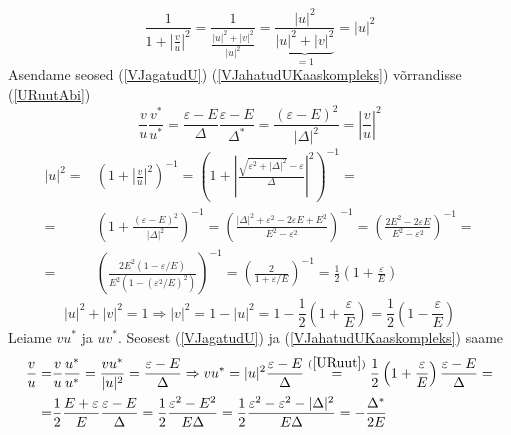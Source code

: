 \documentclass[class=article, crop=false]{standalone}
\begin{document}
\begin{equation}\label{URuutAbi}
	\frac{1}{1 + \left| \frac{v}{u} \right|^{2}} = \frac{1}{ \frac{|u|^{2} + |v|^{2}}{|u|^{2}}} = \frac{|u|^{2}}{\underbrace{|u|^{2} + |v|^{2}}_{=1}} = |u|^{2}
\end{equation}
Asendame seosed (\ref{VJagatudU}) (\ref{VJahatudUKaaskompleks}) võrrandisse (\ref{URuutAbi})
\begin{equation}\label{key}
	\frac{v}{u} \frac{v^{ \ast}}{u^{ \ast}} = \frac{ \varepsilon - E}{ \Delta} \frac{ \varepsilon - E}{ \Delta^{ \ast}} = \frac{( \varepsilon - E)^{2}}{| \Delta|^{2}} = \left| \frac{v}{u} \right|^{2}
\end{equation}
\begin{equation}\label{URuut}
	\begin{split}
		|u|^{2} = & \left( 1 + \left| \frac{v}{u} \right|^{2} \right)^{-1} = \left( 1 + \left| \frac{ \sqrt{ \varepsilon^{2} + | \Delta|^{2}} - \varepsilon}{ \Delta} \right|^{2} \right)^{-1} = \\
		= & \left( 1 + \frac{( \varepsilon - E)^{2}}{| \Delta|^{2}} \right)^{-1} = \left(\frac{| \Delta|^{2} + \varepsilon^{2} - 2 \varepsilon E + E^{2}}{ E^{2} - \varepsilon^{2}} \right)^{-1} = \left( \frac{2E^{2} - 2 \varepsilon E}{E^{2} - \varepsilon^{2}} \right)^{-1} = \\
		= & \left( \frac{2 E^{2} (1 - \varepsilon/E)}{E^{2} (1 - ( \varepsilon^{2}/E)^{2})} \right)^{-1} = \left( \frac{2}{1 + \varepsilon/E} \right)^{-1} = \frac{1}{2} \left( 1 + \frac{ \varepsilon}{E} \right) 
	\end{split}
\end{equation}
\begin{equation}\label{VRuut}
	|u|^{2} + |v|^{2} = 1 \Rightarrow |v|^{2} = 1 - |u|^{2} = 1 - \frac{1}{2} \left( 1 + \frac{ \varepsilon}{E} \right) = \frac{1}{2} \left( 1 - \frac{ \varepsilon}{E} \right)
\end{equation}
Leiame $ v u^{ \ast} $ ja $ u v^{ \ast} $. Seosest (\ref{VJagatudU}) ja (\ref{VJahatudUKaaskompleks}) saame
\begin{equation}\label{key}
	\begin{split}
		\frac{v}{u} = & \frac{v}{u} \frac{u^{ \ast}}{u^{ \ast}} = \frac{v u^{ \ast}}{|u|^{2}} = \frac{ \varepsilon - E}{ \Delta} \Rightarrow v u^{ \ast} = |u|^{2} \frac{ \varepsilon - E}{ \Delta} \overset{( \ref{URuut})}{=} \frac{1}{2} \left( 1 + \frac{ \varepsilon}{E} \right) \frac{ \varepsilon - E}{ \Delta} = \\
		= & \frac{1}{2} \frac{ E + \varepsilon}{E} \frac{\varepsilon - E}{ \Delta} = \frac{1}{2} \frac{\varepsilon^{2} - E^{2}}{ E \Delta} = \frac{1}{2} \frac{ \varepsilon^{2} - \varepsilon^{2} - | \Delta|^{2}}{E \Delta} = - \frac{ \Delta^{ \ast}}{2 E}
	\end{split}
\end{equation}
\end{document}
